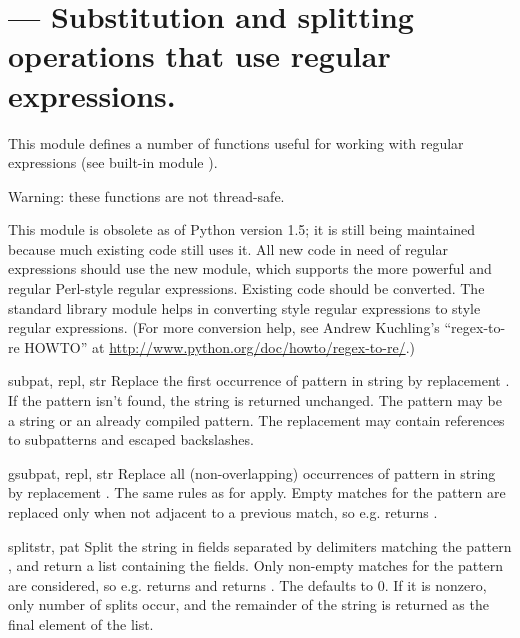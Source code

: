 \section{ ---
         Substitution and splitting operations that use regular expressions.}



This module defines a number of functions useful for working with
regular expressions (see built-in module ).

Warning: these functions are not thread-safe.

This module is obsolete as of Python version 1.5; it is still being
maintained because much existing code still uses it.  All new code in
need of regular expressions should use the new  module, which
supports the more powerful and regular Perl-style regular expressions.
Existing code should be converted.  The standard library module
 helps in converting  style regular
expressions to  style regular expressions.  (For more
conversion help, see Andrew Kuchling's
``regex-to-re HOWTO'' at
\url{http://www.python.org/doc/howto/regex-to-re/}.)


\begin{funcdesc}{sub}{pat, repl, str}
Replace the first occurrence of pattern  in string
 by replacement .  If the pattern isn't found,
the string is returned unchanged.  The pattern may be a string or an
already compiled pattern.  The replacement may contain references
 to subpatterns and escaped backslashes.
\end{funcdesc}

\begin{funcdesc}{gsub}{pat, repl, str}
Replace all (non-overlapping) occurrences of pattern  in
string  by replacement .  The same rules as for
 apply.  Empty matches for the pattern are replaced only
when not adjacent to a previous match, so e.g.
 returns .
\end{funcdesc}

\begin{funcdesc}{split}{str, pat}
Split the string  in fields separated by delimiters matching
the pattern , and return a list containing the fields.  Only
non-empty matches for the pattern are considered, so e.g.
 returns \code{['a', 'b']} and
 returns \code{['abc']}.  The 
defaults to 0. If it is nonzero, only  number of splits
occur, and the remainder of the string is returned as the final
element of the list.
\end{funcdesc}


